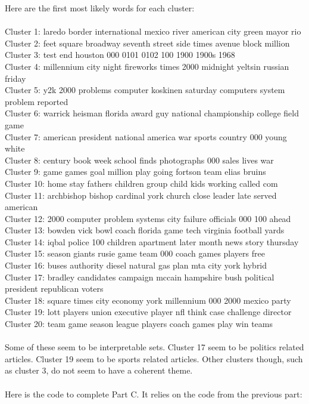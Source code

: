 \documentclass[twoside,11pt]{article}
\theoremstyle{definition}
\begin{document}
Here are the first most likely words for each cluster:\\
\\
Cluster 1: laredo border international mexico river american city green mayor rio \\
Cluster 2: feet square broadway seventh street side times avenue block million \\
Cluster 3: test end houston 000 0101 0102 100 1900 1900s 1968 \\
Cluster 4: millennium city night fireworks times 2000 midnight yeltsin russian friday \\
Cluster 5: y2k 2000 problems computer koskinen saturday computers system problem reported \\
Cluster 6: warrick heisman florida award guy national championship college field game \\
Cluster 7: american president national america war sports country 000 young white \\
Cluster 8: century book week school finds photographs 000 sales lives war \\
Cluster 9: game games goal million play going fortson team elias bruins \\
Cluster 10: home stay fathers children group child kids working called com\\ 
Cluster 11: archbishop bishop cardinal york church close leader late served american \\
Cluster 12: 2000 computer problem systems city failure officials 000 100 ahead \\
Cluster 13: bowden vick bowl coach florida game tech virginia football yards \\
Cluster 14: iqbal police 100 children apartment later month news story thursday\\ 
Cluster 15: season giants rusie game team 000 coach games players free \\
Cluster 16: buses authority diesel natural gas plan mta city york hybrid \\
Cluster 17: bradley candidates campaign mccain hampshire bush political president republican voters \\
Cluster 18: square times city economy york millennium 000 2000 mexico party \\
Cluster 19: lott players union executive player nfl think case challenge director \\
Cluster 20: team game season league players coach games play win teams \\
\\
Some of these seem to be interpretable sets. Cluster 17 seem to be politics related articles. Cluster 19 seem to be sports related articles. Other clusters though, such as cluster 3, do not seem to have a coherent theme. \\
\\
Here is the code to complete Part C. It relies on the code from the previous part: \\

\end{document}
